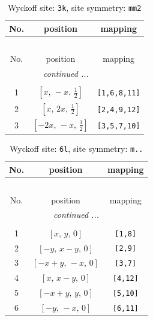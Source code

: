\documentclass[fleqn,8pt]{jsarticle}
\begin{document}
\begin{longtable}{ccc}
\caption{Wyckoff site: {\tt 3k}, site symmetry: {\tt mm2}}
 \\
 \hline \hline
No. & position & mapping \\ \hline \endfirsthead

\multicolumn{2}{l}{\tablename\ \thetable{}} \\
 \hline \hline
No. & position & mapping \\ \hline \endhead

 \hline \hline
\multicolumn{2}{r}{\footnotesize\it continued ...} \\ \endfoot

 \hline \hline
\multicolumn{2}{r}{} \\ \endlastfoot

1 & $\left[ x,\, - x,\, \frac{1}{2} \right]$ & {\tt [1,6,8,11]} \\ \hline
2 & $\left[ x,\, 2 x,\, \frac{1}{2} \right]$ & {\tt [2,4,9,12]} \\ \hline
3 & $\left[ - 2 x,\, - x,\, \frac{1}{2} \right]$ & {\tt [3,5,7,10]} \\
\end{longtable}
\renewcommand{\arraystretch}{1.2}
\begin{longtable}{ccc}
\caption{Wyckoff site: {\tt 6l}, site symmetry: {\tt m..}}
 \\
 \hline \hline
No. & position & mapping \\ \hline \endfirsthead

\multicolumn{2}{l}{\tablename\ \thetable{}} \\
 \hline \hline
No. & position & mapping \\ \hline \endhead

 \hline \hline
\multicolumn{2}{r}{\footnotesize\it continued ...} \\ \endfoot

 \hline \hline
\multicolumn{2}{r}{} \\ \endlastfoot

1 & $\left[ x,\, y,\, 0 \right]$ & {\tt [1,8]} \\ \hline
2 & $\left[ - y,\, x - y,\, 0 \right]$ & {\tt [2,9]} \\ \hline
3 & $\left[ - x + y,\, - x,\, 0 \right]$ & {\tt [3,7]} \\ \hline
4 & $\left[ x,\, x - y,\, 0 \right]$ & {\tt [4,12]} \\ \hline
5 & $\left[ - x + y,\, y,\, 0 \right]$ & {\tt [5,10]} \\ \hline
6 & $\left[ - y,\, - x,\, 0 \right]$ & {\tt [6,11]} \\
\end{longtable}
\end{document}
